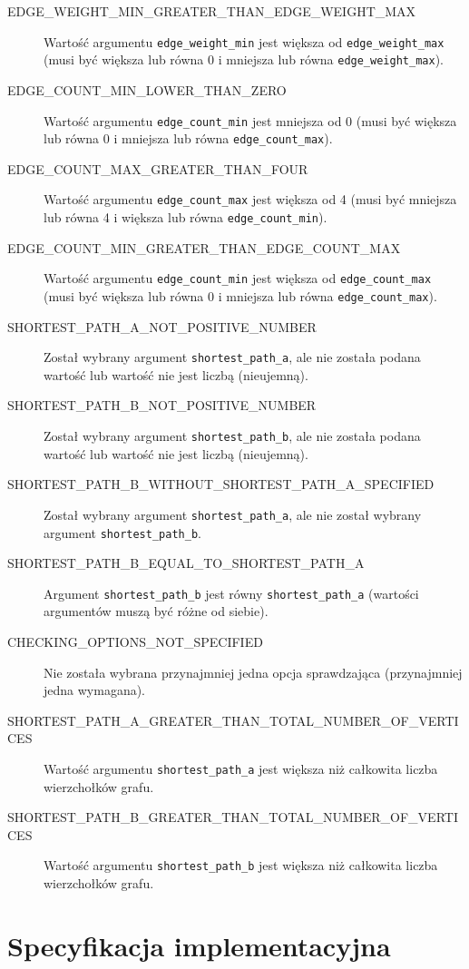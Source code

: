 \documentclass[11pt,a4paper]{report}
\begin{document}
\begin{description}
        \item[EDGE\_WEIGHT\_MIN\_GREATER\_THAN\_EDGE\_WEIGHT\_MAX] Wartość argumentu \verb|edge_weight_min| jest większa od \verb|edge_weight_max| (musi być większa lub równa 0 i mniejsza lub równa \verb|edge_weight_max|).
        \item[EDGE\_COUNT\_MIN\_LOWER\_THAN\_ZERO] Wartość argumentu \verb|edge_count_min| jest mniejsza od 0 (musi być większa lub równa 0 i mniejsza lub równa \verb|edge_count_max|).
        \item[EDGE\_COUNT\_MAX\_GREATER\_THAN\_FOUR] Wartość argumentu \verb|edge_count_max| jest większa od 4 (musi być mniejsza lub równa 4 i większa lub równa \verb|edge_count_min|).
        \item[EDGE\_COUNT\_MIN\_GREATER\_THAN\_EDGE\_COUNT\_MAX] Wartość argumentu \verb|edge_count_min| jest większa od \verb|edge_count_max| (musi być większa lub równa 0 i mniejsza lub równa \verb|edge_count_max|).
        \item[SHORTEST\_PATH\_A\_NOT\_POSITIVE\_NUMBER] Został wybrany argument \verb|shortest_path_a|, ale nie została podana wartość lub wartość nie jest liczbą (nieujemną).
        \item[SHORTEST\_PATH\_B\_NOT\_POSITIVE\_NUMBER] Został wybrany argument \verb|shortest_path_b|, ale nie została podana wartość lub wartość nie jest liczbą (nieujemną).
        \item[SHORTEST\_PATH\_B\_WITHOUT\_SHORTEST\_PATH\_A\_SPECIFIED] Został wybrany argument \verb|shortest_path_a|, ale nie został wybrany argument \verb|shortest_path_b|.
        \item[SHORTEST\_PATH\_B\_EQUAL\_TO\_SHORTEST\_PATH\_A] Argument \verb|shortest_path_b| jest równy \verb|shortest_path_a| (wartości argumentów muszą być różne od siebie).
        \item[CHECKING\_OPTIONS\_NOT\_SPECIFIED] Nie została wybrana przynajmniej jedna opcja sprawdzająca (przynajmniej jedna wymagana).
        \item[SHORTEST\_PATH\_A\_GREATER\_THAN\_TOTAL\_NUMBER\_OF\_VERTICES] Wartość argumentu \verb|shortest_path_a| jest większa niż całkowita liczba wierzchołków grafu.
        \item[SHORTEST\_PATH\_B\_GREATER\_THAN\_TOTAL\_NUMBER\_OF\_VERTICES] Wartość argumentu \verb|shortest_path_b| jest większa niż całkowita liczba wierzchołków grafu. 
    \end{description}


    \chapter{Specyfikacja implementacyjna}
    
\end{document}
